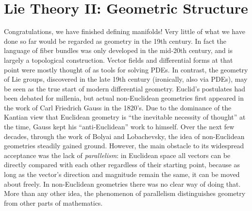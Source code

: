 \chapter{Lie Theory II: Geometric Structure}\label{chap: Lie theory ii}

\begin{hrem*}
    \small
    Congratulations, we have finished defining manifolds! Very little of what we have done so far would be regarded as geometry in the 19th century. In fact the language of fiber bundles was only developed in the mid-20th century, and is largely a topological construction. Vector fields and differential forms at that point were mostly thought of as tools for solving PDEs. In contrast, the geometry of Lie groups, discovered in the late 19th century (ironically, also via PDEs), may be seen as the true start of modern differential geometry. Euclid's postulates had been debated for millenia, but actual non-Euclidean geometries first appeared in the work of Carl Friedrich Gauss in the 1820's. Due to the dominance of the Kantian view that Euclidean geometry is ``the inevitable necessity of thought'' at the time, Gauss kept his ``anti-Euclidean'' work to himself. Over the next few decades, through the work of Bolyai and Lobachevsky, the idea of non-Euclidean geometries steadily gained ground. However, the main obstacle to its widespread acceptance was the lack of \emph{parallelism}: in Euclidean space all vectors can be directly compared with each other regardless of their starting point, because as long as the vector's direction and magnitude remain the same, it can be moved about freely. In non-Euclidean geometries there was no clear way of doing that. More than any other idea, the phenomenon of parallelism distinguishes geometry from other parts of mathematics.
    

\end{hrem*}
